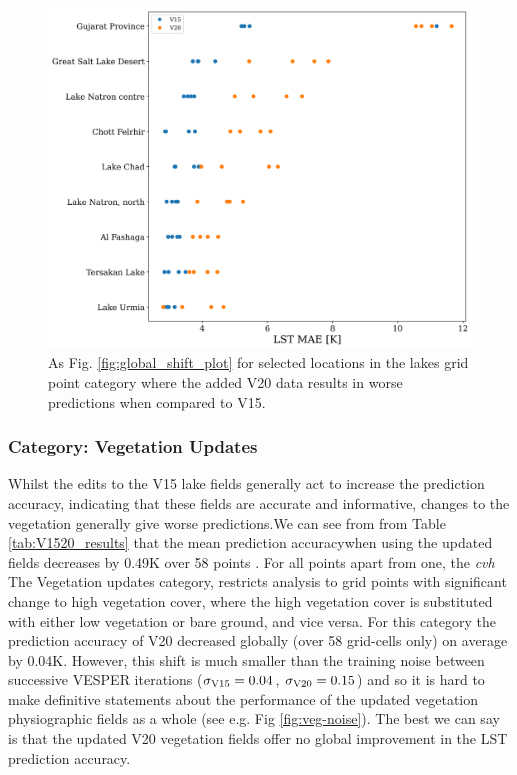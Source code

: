 \documentclass[hess, twostagejnl]{copernicus}
\providecommand{\DIFadd}[1]{{\protect\color{blue} \sf #1}} %
\providecommand{\DIFdel}[1]{{\protect\color{red} \scriptsize #1}} %
\providecommand{\DIFaddbegin}{} %
\providecommand{\DIFaddend}{} %
\providecommand{\DIFdelbegin}{} %
\providecommand{\DIFdelend}{} %
\providecommand{\DIFaddFL}[1]{\DIFadd{#1}} %
\begin{document}
\DIFaddbegin \begin{figure}
	\includegraphics[width=\columnwidth]{selected_points_shift_plot_new}
	\caption{\DIFaddFL{As Fig. \ref{fig:global_shift_plot} for selected locations in the lakes grid point category where the added V20 data results in worse predictions when compared to V15.}} 
	\label{fig:lake_sub_categories}
\end{figure}


\DIFaddend \subsubsection{Category: Vegetation Updates}
\DIFdelbegin %
\DIFdel{Whilst the edits to the V15 lake fields generally act to increase the prediction accuracy, indicating that these fields are accurate and informative, changes to the vegetation generally give worse predictions.We can see from from Table \ref{tab:V1520_results} that the mean prediction accuracywhen using the updated fields decreases by 0.49K over 58 points . For all points apart from one, the \textit{cvh} }\DIFdelend \DIFaddbegin \DIFadd{The Vegetation updates category, restricts analysis to grid points with significant change to high vegetation cover, where  the high vegetation cover is substituted with either low vegetation or bare ground, and vice versa. For this category the prediction accuracy of V20 decreased globally (over 58 grid-cells only) on average by 0.04K. However, this shift is much smaller than the training noise between successive VESPER iterations ($\sigma_{\rm V15} = 0.04$, $\sigma_{\rm V20} = 0.15$) and so it is hard to make definitive statements about the performance of the updated vegetation physiographic fields as a whole (see e.g. Fig \ref{fig:veg-noise}). The best we can say is that the updated V20 vegetation fields offer no global improvement in the LST prediction accuracy. }\newline 
\end{document}
